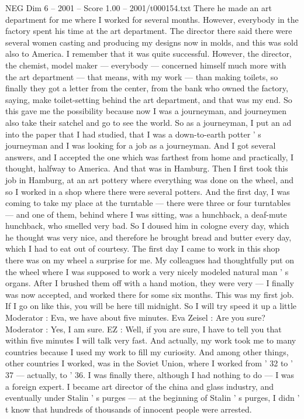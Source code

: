 \begin{textsample}{NEG Dim 6 – 2001 – Score 1.00 – 2001/t000154.txt}
There he made an art department for me where I worked for several months.
However, everybody in the factory spent his time at the art department.
The director there said there were several women casting and producing my designs now in molds, and this was sold also to America.
I remember that it was quite successful.
However, the director, the chemist, model maker — everybody — concerned himself much more with the art department — that means, with my work — than making toilets, so finally they got a letter from the center, from the bank who owned the factory, saying, make toilet-setting behind the art department, and that was my end.
So this gave me the possibility because now I was a journeyman, and journeymen also take their satchel and go to see the world.
So as a journeyman, I put an ad into the paper that I had studied, that I was a down-to-earth potter ' s journeyman and I was looking for a job as a journeyman.
And I got several answers, and I accepted the one which was farthest from home and practically, I thought, halfway to America.
And that was in Hamburg.
Then I first took this job in Hamburg, at an art pottery where everything was done on the wheel, and so I worked in a shop where there were several potters.
And the first day, I was coming to take my place at the turntable — there were three or four turntables — and one of them, behind where I was sitting, was a hunchback, a deaf-mute hunchback, who smelled very bad.
So I doused him in cologne every day, which he thought was very nice, and therefore he brought bread and butter every day, which I had to eat out of courtesy.
The first day I came to work in this shop there was on my wheel a surprise for me.
My colleagues had thoughtfully put on the wheel where I was supposed to work a very nicely modeled natural man ' s organs.
After I brushed them off with a hand motion, they were very — I finally was now accepted, and worked there for some six months.
This was my first job.
If I go on like this, you will be here till midnight.
So I will try speed it up a little Moderator : Eva, we have about five minutes.
Eva Zeisel : Are you sure?
Moderator : Yes, I am sure.
EZ : Well, if you are sure, I have to tell you that within five minutes I will talk very fast.
And actually, my work took me to many countries because I used my work to fill my curiosity.
And among other things, other countries I worked, was in the Soviet Union, where I worked from ' 32 to ' 37 — actually, to ' 36.
I was finally there, although I had nothing to do — I was a foreign expert.
I became art director of the china and glass industry, and eventually under Stalin ' s purges — at the beginning of Stalin ' s purges, I didn ' t know that hundreds of thousands of innocent people were arrested.

\end{textsample}
